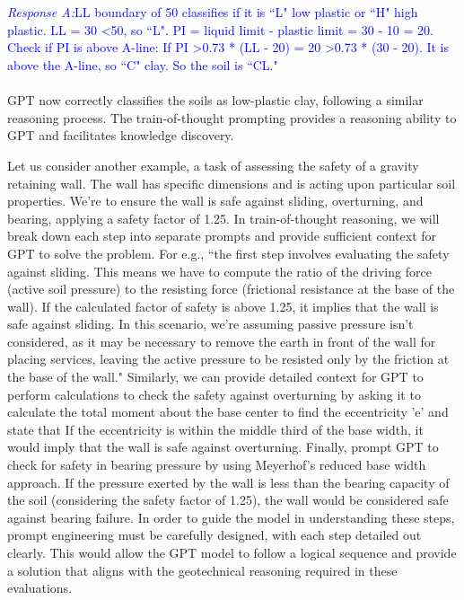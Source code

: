 \documentclass[12pt]{article}
\begin{document}
\\\\
\textcolor{blue}{\textit{Response A:}LL boundary of 50 classifies if it is ``L" low plastic or ``H" high plastic. LL = 30 \textless 50, so ``L". PI = liquid limit - plastic limit = 30 - 10 = 20. Check if PI is above A-line: If PI \textgreater 0.73 * (LL - 20) = 20 \textgreater 0.73 * (30 - 20). It is above the A-line, so ``C" clay. So the soil is ``CL."}
\\\\GPT now correctly classifies the soils as low-plastic clay, following a similar reasoning process. The train-of-thought prompting provides a reasoning ability to GPT and facilitates knowledge discovery. 

Let us consider another example, a task of assessing the safety of a gravity retaining wall. The wall has specific dimensions and is acting upon particular soil properties. We're to ensure the wall is safe against sliding, overturning, and bearing, applying a safety factor of 1.25. In train-of-thought reasoning, we will break down each step into separate prompts and provide sufficient context for GPT to solve the problem. For e.g., ``the first step involves evaluating the safety against sliding. This means we have to compute the ratio of the driving force (active soil pressure) to the resisting force (frictional resistance at the base of the wall). If the calculated factor of safety is above 1.25, it implies that the wall is safe against sliding. In this scenario, we're assuming passive pressure isn't considered, as it may be necessary to remove the earth in front of the wall for placing services, leaving the active pressure to be resisted only by the friction at the base of the wall." Similarly, we can provide detailed context for GPT to perform calculations to check the safety against overturning by asking it to calculate the total moment about the base center to find the eccentricity 'e' and state that If the eccentricity is within the middle third of the base width, it would imply that the wall is safe against overturning. Finally, prompt GPT to check for safety in bearing pressure by using Meyerhof's reduced base width approach. If the pressure exerted by the wall is less than the bearing capacity of the soil (considering the safety factor of 1.25), the wall would be considered safe against bearing failure. In order to guide the model in understanding these steps, prompt engineering must be carefully designed, with each step detailed out clearly. This would allow the GPT model to follow a logical sequence and provide a solution that aligns with the geotechnical reasoning required in these evaluations.
\end{document}
